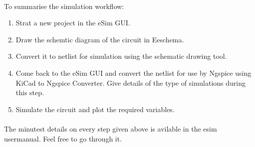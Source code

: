 \paragraph{}To summarise the simulation workflow:

\begin{enumerate}
\item
Strat a new project in the eSim GUI.
\item
Draw the schemtic diagram of the circuit in Eeschema.
\item
Convert it to netlist for simulation using the schematic drawing tool.
\item
Come back to the eSim GUI and convert the netlist for use by Ngspice using KiCad to Ngspice Converter. Give details of the type of simulations during this step.

\item
Simulate the circuit and plot the required variables.

\end{enumerate}


\paragraph{}

The minutest details on every step given above is avilable in the esim usermanual\cite{esimusermanual}. Feel free to go through it.



